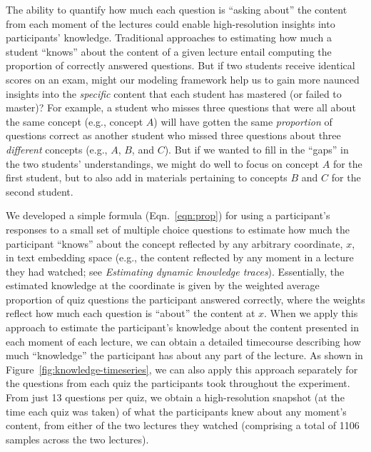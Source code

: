 \documentclass[10pt]{article}
\begin{document}
The ability to quantify how much each question is ``asking about'' the content
from each moment of the lectures could enable high-resolution insights into
participants' knowledge. Traditional approaches to estimating how much a
student ``knows'' about the content of a given lecture entail computing the
proportion of correctly answered questions. But if two students receive
identical scores on an exam, might our modeling framework help us to gain more
naunced insights into the \textit{specific} content that each student has
mastered (or failed to master)? For example, a student who misses three
questions that were all about the same concept (e.g., concept $A$) will have
gotten the same \textit{proportion} of questions correct as another student who
missed three questions about three \textit{different} concepts (e.g., $A$, $B$,
and $C$). But if we wanted to fill in the ``gaps'' in the two students'
understandings, we might do well to focus on concept $A$ for the first student,
but to also add in materials pertaining to concepts $B$ and $C$ for the second
student.

We developed a simple formula (Eqn.~\ref{eqn:prop}) for using a participant's
responses to a small set of multiple choice questions to estimate how much the
participant ``knows'' about the concept reflected by any arbitrary coordinate,
$x$, in text embedding space (e.g., the content reflected by any moment in a
lecture they had watched; see \textit{Estimating dynamic knowledge traces}).
Essentially, the estimated knowledge at the coordinate is given by the weighted
average proportion of quiz questions the participant answered correctly, where
the weights reflect how much each question is ``about'' the content at $x$.
When we apply this approach to estimate the participant's knowledge about the
content presented in each moment of each lecture, we can obtain a detailed
timecourse describing how much ``knowledge'' the participant has about any part
of the lecture. As shown in Figure~\ref{fig:knowledge-timeseries}, we can also
apply this approach separately for the questions from each quiz the
participants took throughout the experiment. From just 13 questions per quiz,
we obtain a high-resolution snapshot (at the time each quiz was taken) of what
the participants knew about any moment's content, from either of the two
lectures they watched (comprising a total of 1106 samples across the two
lectures).
\end{document}
